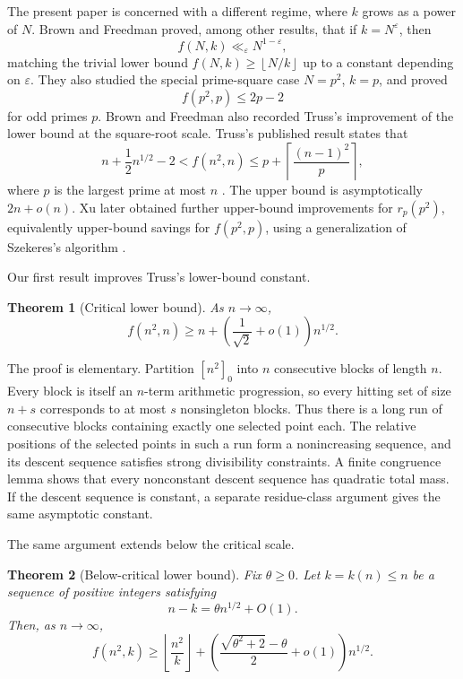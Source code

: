 \documentclass[11pt]{article}
\newtheorem{theorem}{Theorem}[section]
\theoremstyle{remark}
\newcommand{\floor}[1]{\left\lfloor #1\right\rfloor}
\newcommand{\ceil}[1]{\left\lceil #1\right\rceil}
\numberwithin{equation}{section}
\begin{document}
The present paper is concerned with a different regime, where $k$ grows as a power of $N$.
Brown and Freedman proved, among other results, that if $k=N^\varepsilon$, then
\[
        f(N,k)\ll_\varepsilon N^{1-\varepsilon},
\]
matching the trivial lower bound $f(N,k)\ge \floor{N/k}$ up to a constant depending on $\varepsilon$.
They also studied the special prime-square case $N=p^2$, $k=p$, and proved
\[
        f(p^2,p)\le 2p-2
\]
for odd primes $p$.
Brown and Freedman also recorded Truss's improvement of the lower bound at the square-root scale.
Truss's published result states that
\[
        n+\frac12 n^{1/2}-2
        <
        f(n^2,n)
        \le
        p+\ceil{\frac{(n-1)^2}{p}},
\]
where $p$ is the largest prime at most $n$ \cite{Truss}.
The upper bound is asymptotically $2n+o(n)$.
Xu later obtained further upper-bound improvements for $r_p(p^2)$, equivalently upper-bound savings for $f(p^2,p)$, using a generalization of Szekeres's algorithm \cite{Xu}.

Our first result improves Truss's lower-bound constant.

\begin{theorem}[Critical lower bound]\label{thm:critical}
As $n\to\infty$,
\[
        f(n^2,n)
        \ge
        n+\left(\frac1{\sqrt2}+o(1)\right)n^{1/2}.
\]
\end{theorem}

The proof is elementary.
Partition $[n^2]_0$ into $n$ consecutive blocks of length $n$.
Every block is itself an $n$-term arithmetic progression, so every hitting set of size $n+s$ corresponds to at most $s$ nonsingleton blocks.
Thus there is a long run of consecutive blocks containing exactly one selected point each.
The relative positions of the selected points in such a run form a nonincreasing sequence, and its descent sequence satisfies strong divisibility constraints.
A finite congruence lemma shows that every nonconstant descent sequence has quadratic total mass.
If the descent sequence is constant, a separate residue-class argument gives the same asymptotic constant.

The same argument extends below the critical scale.

\begin{theorem}[Below-critical lower bound]\label{thm:below}
Fix $\theta\ge0$.
Let $k=k(n)\le n$ be a sequence of positive integers satisfying
\[
        n-k=\theta n^{1/2}+O(1).
\]
Then, as $n\to\infty$,
\[
        f(n^2,k)
        \ge
        \floor{\frac{n^2}{k}}
        +
        \left(\frac{\sqrt{\theta^2+2}-\theta}{2}+o(1)\right)n^{1/2}.
\]
\end{theorem}
\end{document}

